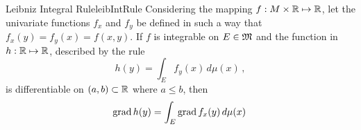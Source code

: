 \begin{mcoro}{Leibniz Integral Rule}{leibIntRule}
Considering the mapping $f : M\times\mathbb{R} \mapsto \mathbb{R}$, let the univariate functions $f_x$ and $f_y$ be defined in such a way that $f_x(y)=f_y(x)=f(x,y)$. If $f$ is integrable on $E\in\mathfrak{M}$ and the function in $h : \mathbb{R} \mapsto \mathbb{R}$, described by the rule  
\begin{equation*}
h(y) = \int_E f_y(x)\, d\mu(x)\,,
\end{equation*}
is differentiable on $(a,b)\subset\mathbb{R}$ where $a\leqslant b$, then
\begin{equation*}
 \operatorname{grad}{h}(y) =  \int_E \operatorname{grad}{f_x}(y)\, d\mu(x)\,
\end{equation*}
\end{mcoro}



